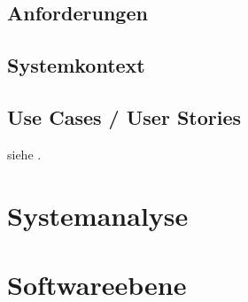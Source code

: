 \subsection{Anforderungen}\label{subsec:anforderungen2}


\subsection{Systemkontext}\label{subsec:systemkontext2}


\subsection{Use Cases / User Stories}\label{subsec:use-cases-user-stories}




siehe  .


\section{Systemanalyse}\label{sec:systemanalyse}



\section{Softwareebene}\label{sec:softwareebene}


